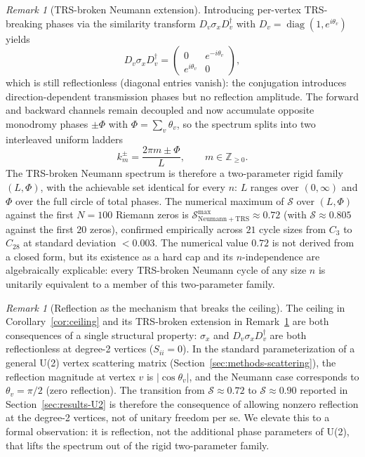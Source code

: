 \documentclass[cntp]{ipart}
\theoremstyle{plain}
\theoremstyle{remark}
\newtheorem{rem}[thm]{Remark}
\begin{document}
\begin{rem}[TRS-broken Neumann extension]\label{rem:trs}
Introducing per-vertex TRS-breaking phases via the similarity transform $D_v \sigma_x D_v^\dagger$ with $D_v = \operatorname{diag}(1, e^{i\theta_v})$ yields
\begin{equation}
    D_v \sigma_x D_v^\dagger = \begin{pmatrix} 0 & e^{-i\theta_v} \\ e^{i\theta_v} & 0 \end{pmatrix},
\end{equation}
which is still reflectionless (diagonal entries vanish): the conjugation introduces direction-dependent transmission phases but no reflection amplitude. The forward and backward channels remain decoupled and now accumulate opposite monodromy phases $\pm \Phi$ with $\Phi = \sum_v \theta_v$, so the spectrum splits into two interleaved uniform ladders
\begin{equation}
    k_m^{\pm} = \frac{2\pi m \pm \Phi}{L}, \qquad m \in \mathbb{Z}_{\geq 0}.
\end{equation}
The TRS-broken Neumann spectrum is therefore a two-parameter rigid family $(L, \Phi)$, with the achievable set identical for every $n$: $L$ ranges over $(0, \infty)$ and $\Phi$ over the full circle of total phases. The numerical maximum of $\mathcal{S}$ over $(L, \Phi)$ against the first $N = 100$ Riemann zeros is $\mathcal{S}_{\mathrm{Neumann+TRS}}^{\max} \approx 0.72$ (with $\mathcal{S} \approx 0.805$ against the first $20$ zeros), confirmed empirically across $21$ cycle sizes from $C_3$ to $C_{28}$ at standard deviation $< 0.003$. The numerical value $0.72$ is not derived from a closed form, but its existence as a hard cap and its $n$-independence are algebraically explicable: every TRS-broken Neumann cycle of any size $n$ is unitarily equivalent to a member of this two-parameter family.
\end{rem}

\begin{rem}[Reflection as the mechanism that breaks the ceiling]\label{rem:reflection}
The ceiling in Corollary~\ref{cor:ceiling} and its TRS-broken extension in Remark~\ref{rem:trs} are both consequences of a single structural property: $\sigma_x$ and $D_v \sigma_x D_v^\dagger$ are both reflectionless at degree-2 vertices ($S_{ii} = 0$). In the standard parameterization of a general U(2) vertex scattering matrix (Section~\ref{sec:methods-scattering}), the reflection magnitude at vertex $v$ is $|\cos\theta_v|$, and the Neumann case corresponds to $\theta_v = \pi/2$ (zero reflection). The transition from $\mathcal{S} \approx 0.72$ to $\mathcal{S} \approx 0.90$ reported in Section~\ref{sec:results-U2} is therefore the consequence of allowing nonzero reflection at the degree-2 vertices, not of unitary freedom per se. We elevate this to a formal observation: it is reflection, not the additional phase parameters of U(2), that lifts the spectrum out of the rigid two-parameter family.
\end{rem}
\end{document}
